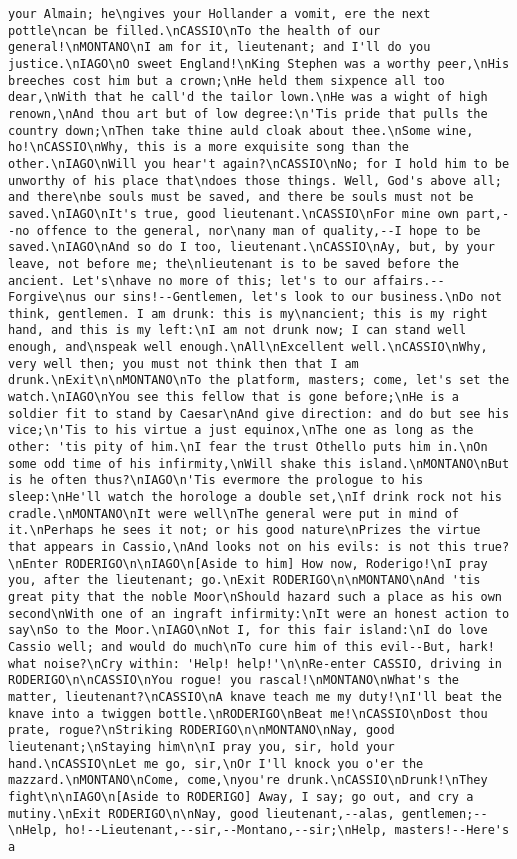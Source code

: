 \begin{verbatim}
your Almain; he\ngives your Hollander a vomit, ere the next pottle\ncan be filled.\nCASSIO\nTo the health of our general!\nMONTANO\nI am for it, lieutenant; and I'll do you justice.\nIAGO\nO sweet England!\nKing Stephen was a worthy peer,\nHis breeches cost him but a crown;\nHe held them sixpence all too dear,\nWith that he call'd the tailor lown.\nHe was a wight of high renown,\nAnd thou art but of low degree:\n'Tis pride that pulls the country down;\nThen take thine auld cloak about thee.\nSome wine, ho!\nCASSIO\nWhy, this is a more exquisite song than the other.\nIAGO\nWill you hear't again?\nCASSIO\nNo; for I hold him to be unworthy of his place that\ndoes those things. Well, God's above all; and there\nbe souls must be saved, and there be souls must not be saved.\nIAGO\nIt's true, good lieutenant.\nCASSIO\nFor mine own part,--no offence to the general, nor\nany man of quality,--I hope to be saved.\nIAGO\nAnd so do I too, lieutenant.\nCASSIO\nAy, but, by your leave, not before me; the\nlieutenant is to be saved before the ancient. Let's\nhave no more of this; let's to our affairs.--Forgive\nus our sins!--Gentlemen, let's look to our business.\nDo not think, gentlemen. I am drunk: this is my\nancient; this is my right hand, and this is my left:\nI am not drunk now; I can stand well enough, and\nspeak well enough.\nAll\nExcellent well.\nCASSIO\nWhy, very well then; you must not think then that I am drunk.\nExit\n\nMONTANO\nTo the platform, masters; come, let's set the watch.\nIAGO\nYou see this fellow that is gone before;\nHe is a soldier fit to stand by Caesar\nAnd give direction: and do but see his vice;\n'Tis to his virtue a just equinox,\nThe one as long as the other: 'tis pity of him.\nI fear the trust Othello puts him in.\nOn some odd time of his infirmity,\nWill shake this island.\nMONTANO\nBut is he often thus?\nIAGO\n'Tis evermore the prologue to his sleep:\nHe'll watch the horologe a double set,\nIf drink rock not his cradle.\nMONTANO\nIt were well\nThe general were put in mind of it.\nPerhaps he sees it not; or his good nature\nPrizes the virtue that appears in Cassio,\nAnd looks not on his evils: is not this true?\nEnter RODERIGO\n\nIAGO\n[Aside to him] How now, Roderigo!\nI pray you, after the lieutenant; go.\nExit RODERIGO\n\nMONTANO\nAnd 'tis great pity that the noble Moor\nShould hazard such a place as his own second\nWith one of an ingraft infirmity:\nIt were an honest action to say\nSo to the Moor.\nIAGO\nNot I, for this fair island:\nI do love Cassio well; and would do much\nTo cure him of this evil--But, hark! what noise?\nCry within: 'Help! help!'\n\nRe-enter CASSIO, driving in RODERIGO\n\nCASSIO\nYou rogue! you rascal!\nMONTANO\nWhat's the matter, lieutenant?\nCASSIO\nA knave teach me my duty!\nI'll beat the knave into a twiggen bottle.\nRODERIGO\nBeat me!\nCASSIO\nDost thou prate, rogue?\nStriking RODERIGO\n\nMONTANO\nNay, good lieutenant;\nStaying him\n\nI pray you, sir, hold your hand.\nCASSIO\nLet me go, sir,\nOr I'll knock you o'er the mazzard.\nMONTANO\nCome, come,\nyou're drunk.\nCASSIO\nDrunk!\nThey fight\n\nIAGO\n[Aside to RODERIGO] Away, I say; go out, and cry a mutiny.\nExit RODERIGO\n\nNay, good lieutenant,--alas, gentlemen;--\nHelp, ho!--Lieutenant,--sir,--Montano,--sir;\nHelp, masters!--Here's a 
\end{verbatim}
